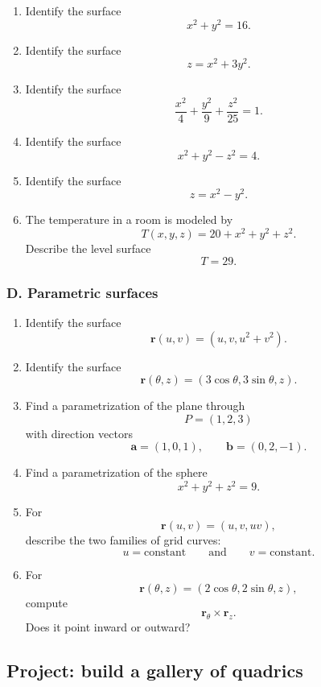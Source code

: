 \begin{enumerate}
\item Identify the surface
\[
    x^2+y^2=16.
\]

\item Identify the surface
\[
    z=x^2+3y^2.
\]

\item Identify the surface
\[
    \frac{x^2}{4}+\frac{y^2}{9}+\frac{z^2}{25}=1.
\]

\item Identify the surface
\[
    x^2+y^2-z^2=4.
\]

\item Identify the surface
\[
    z=x^2-y^2.
\]

\item The temperature in a room is modeled by
\[
    T(x,y,z)=20+x^2+y^2+z^2.
\]
Describe the level surface
\[
    T=29.
\]
\end{enumerate}

\subsubsection*{D. Parametric surfaces}

\begin{enumerate}
\item Identify the surface
\[
    \mathbf r(u,v)=(u,v,u^2+v^2).
\]

\item Identify the surface
\[
    \mathbf r(\theta,z)=(3\cos\theta,3\sin\theta,z).
\]

\item Find a parametrization of the plane through
\[
    P=(1,2,3)
\]
with direction vectors
\[
    \mathbf a=(1,0,1),
    \qquad
    \mathbf b=(0,2,-1).
\]

\item Find a parametrization of the sphere
\[
    x^2+y^2+z^2=9.
\]

\item For
\[
    \mathbf r(u,v)=(u,v,uv),
\]
describe the two families of grid curves:
\[
    u=\text{constant}
    \qquad\text{and}\qquad
    v=\text{constant}.
\]

\item For
\[
    \mathbf r(\theta,z)=(2\cos\theta,2\sin\theta,z),
\]
compute
\[
    \mathbf r_\theta\times\mathbf r_z.
\]
Does it point inward or outward?
\end{enumerate}

\subsection{Project: build a gallery of quadrics}

